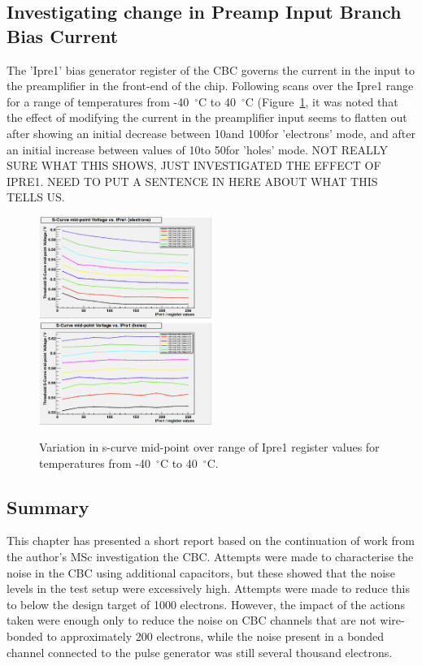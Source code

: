 \subsection{Investigating change in Preamp Input Branch Bias Current}
\label{ss:investigating_change_in_preamp_input_branch_bias_current}
The 'Ipre1' bias generator register of the CBC governs the current in the input to the preamplifier in the
front-end of the chip. Following scans over the Ipre1 range for a range of temperatures from -40~$^{\circ}$C
to 40~$^{\circ}$C (Figure~\ref{fig:midpoint_v_ipre1}, it was noted that the effect of modifying the current in
the preamplifier input seems to flatten out after showing an initial decrease between 10\uA and 100\uA for
'electrons' mode, and after an initial increase between values of 10\uA to 50\uA for 'holes' mode. NOT REALLY
SURE WHAT THIS SHOWS, JUST INVESTIGATED THE EFFECT OF IPRE1. NEED TO PUT A SENTENCE IN HERE ABOUT WHAT THIS
TELLS US.

\begin{figure}[hbtp]
   \centering
     \includegraphics[width=0.5\textwidth]{Chapters/07_Appendices/07d_ServiceWork/Images/scurve_midpoint_v_ipre1_electrons}\hfill
     \includegraphics[width=0.5\textwidth]{Chapters/07_Appendices/07d_ServiceWork/Images/scurve_midpoint_v_ipre1_holes}
     \caption{Variation in s-curve mid-point over range of Ipre1 register values for temperatures from
     -40~$^{\circ}$C to 40~$^{\circ}$C.}
     \label{fig:midpoint_v_ipre1}
\end{figure}

\subsection{Summary}
\label{ss:summary}
This chapter has presented a short report based on the continuation of work from the author's MSc
investigation the CBC. Attempts were made to characterise the noise in the CBC using additional capacitors,
but these showed that the noise levels in the test setup were excessively high. Attempts were made to reduce this to below
the design target of 1000 electrons. However, the impact of the actions taken were enough only to reduce the
noise on CBC channels that are not wire-bonded to approximately 200 electrons, while the noise present in a
bonded channel connected to the pulse generator was still several thousand electrons. 

